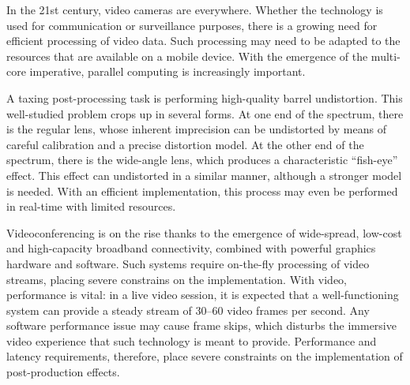 \documentclass[english,12pt]{ifimaster}
\begin{document}

In the 21st century, video cameras are everywhere. Whether the
technology is used for communication or surveillance purposes, there
is a growing need for efficient processing of video data. Such
processing may need to be adapted to the resources that are available
on a mobile device. With the emergence of the multi-core imperative,
parallel computing is increasingly important.




A taxing post-processing task is performing high-quality barrel
undistortion. This well-studied problem crops up in several forms. At
one end of the spectrum, there is the regular lens, whose inherent
imprecision can be undistorted by means of careful calibration and a
precise distortion model. At the other end of the spectrum, there is
the wide-angle lens, which produces a characteristic ``fish-eye''
effect. This effect can undistorted in a similar manner, although a
stronger model is needed. With an efficient implementation, this
process may even be performed in real-time with limited resources.

Videoconferencing is on the rise thanks to the emergence of
wide-spread, low-cost and high-capacity broadband connectivity,
combined with powerful graphics hardware and software. Such systems
require on-the-fly processing of video streams, placing severe
constrains on the implementation. With video, performance is vital: in
a live video session, it is expected that a well-functioning system
can provide a steady stream of $30$--$60$ video frames per second. Any
software performance issue may cause frame skips, which disturbs the
immersive video experience that such technology is meant to provide.
Performance and latency requirements, therefore, place severe
constraints on the implementation of post-production effects.

\end{document}
